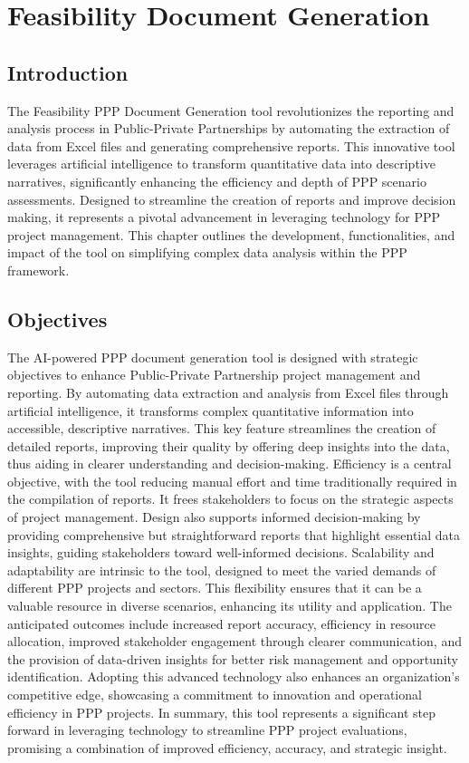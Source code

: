 \chapter{Feasibility Document Generation}

\section{Introduction}

The Feasibility PPP Document Generation tool revolutionizes the reporting and analysis process in Public-Private Partnerships by automating the extraction of data from Excel files and generating comprehensive reports. This innovative tool leverages artificial intelligence to transform quantitative data into descriptive narratives, significantly enhancing the efficiency and depth of PPP scenario assessments. Designed to streamline the creation of reports and improve decision making, it represents a pivotal advancement in leveraging technology for PPP project management. This chapter outlines the development, functionalities, and impact of the tool on simplifying complex data analysis within the PPP framework.

\section{Objectives}

The AI-powered PPP document generation tool is designed with strategic objectives to enhance Public-Private Partnership project management and reporting. By automating data extraction and analysis from Excel files through artificial intelligence, it transforms complex quantitative information into accessible, descriptive narratives. This key feature streamlines the creation of detailed reports, improving their quality by offering deep insights into the data, thus aiding in clearer understanding and decision-making.
\vskip 0.5cm
Efficiency is a central objective, with the tool reducing manual effort and time traditionally required in the compilation of reports. It frees stakeholders to focus on the strategic aspects of project management. Design also supports informed decision-making by providing comprehensive but straightforward reports that highlight essential data insights, guiding stakeholders toward well-informed decisions.
\vskip 0.5cm
Scalability and adaptability are intrinsic to the tool, designed to meet the varied demands of different PPP projects and sectors. This flexibility ensures that it can be a valuable resource in diverse scenarios, enhancing its utility and application.
\vskip 0.5cm
The anticipated outcomes include increased report accuracy, efficiency in resource allocation, improved stakeholder engagement through clearer communication, and the provision of data-driven insights for better risk management and opportunity identification. Adopting this advanced technology also enhances an organization's competitive edge, showcasing a commitment to innovation and operational efficiency in PPP projects.
\vskip 0.5cm
In summary, this tool represents a significant step forward in leveraging technology to streamline PPP project evaluations, promising a combination of improved efficiency, accuracy, and strategic insight.

